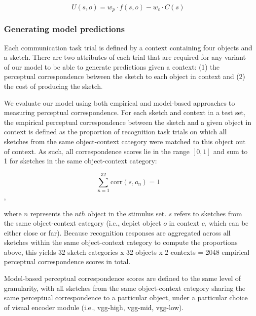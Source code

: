\documentclass[9pt,twocolumn,twoside]{pnas-new}
\begin{document}
{\begin{equation}
U(s,o) =  w_p \cdot  f(s,o) - w_c \cdot C(s)
\end{equation}


\subsubsection*{Generating model predictions}

Each communication task trial is defined by a context containing four objects and a sketch. There are two attributes of each trial that are required for any variant of our model to be able to generate predictions given a context: (1) the perceptual correspondence between the sketch to each object in context and (2) the cost of producing the sketch.

We evaluate our model using both empirical and model-based approaches to measuring perceptual correspondence. For each sketch and context in a test set, the empirical perceptual correspondence between the sketch and a given object in context is defined as the proportion of recognition task trials on which all sketches from the same object-context category were matched to this object out of context. As such, all correspondence scores lie in the range $[0,1]$ and sum to 1 for sketches in the same object-context category:

$$\sum_{n=1}^{32} \textrm{corr} (s,o_{n}) = 1 $$,

where $n$ represents the $nth$ object in the stimulus set. $s$ refers to sketches from the same object-context category (i.e., depict object $o$ in context $c$, which can be either close or far). Because recognition responses are aggregated across all sketches within the same object-context category to compute the proportions above, this yields 32 sketch categories x 32 objects x 2 contexts = 2048 empirical perceptual correspondence scores in total.

Model-based perceptual correspondence scores are defined to the same level of granularity, with all sketches from the same object-context category sharing the same perceptual correspondence to a particular object, under a particular choice of visual encoder module (i.e., vgg-high, vgg-mid, vgg-low).

}
\end{document}
